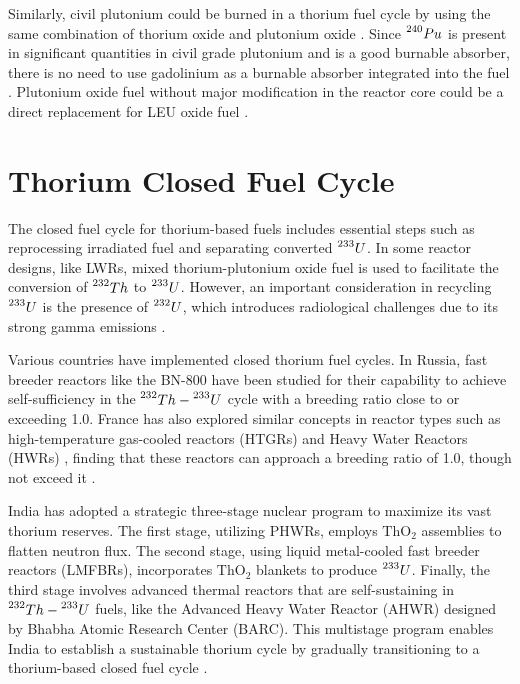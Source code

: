Similarly, civil plutonium could be burned in a thorium fuel cycle by using the same combination of thorium oxide and plutonium oxide \cite{IAEA_Th_Potential}. Since \(\prescript{240}{}{Pu}\) is present in significant quantities in civil grade plutonium and is a good burnable absorber, there is no need to use gadolinium as a burnable absorber integrated into the fuel \cite{IAEA_Th_Potential}. Plutonium oxide fuel without major modification in the reactor core could be a direct replacement for LEU oxide fuel \cite{IAEA_Th_Potential}.


\section{Thorium Closed Fuel Cycle}

The closed fuel cycle for thorium-based fuels includes essential steps such as reprocessing irradiated fuel and separating converted \(\prescript{233}{}{U}\). In some reactor designs, like LWRs, mixed thorium-plutonium oxide fuel is used to facilitate the conversion of \(\prescript{232}{}{Th}\) to \(\prescript{233}{}{U}\). However, an important consideration in recycling \(\prescript{233}{}{U}\) is the presence of \(\prescript{232}{}{U}\), which introduces radiological challenges due to its strong gamma emissions \cite{IAEA_Th_Potential}.

Various countries have implemented closed thorium fuel cycles. In Russia, fast breeder reactors like the BN-800 have been studied for their capability to achieve self-sufficiency in the \(\prescript{232}{}{Th}-\prescript{233}{}{U}\) cycle with a breeding ratio close to or exceeding 1.0. France has also explored similar concepts in reactor types such as high-temperature gas-cooled reactors (HTGRs) and Heavy Water Reactors (HWRs) , finding that these reactors can approach a breeding ratio of 1.0, though not exceed it \cite{IAEA_Th_Potential}.

India has adopted a strategic three-stage nuclear program to maximize its vast thorium reserves. The first stage, utilizing PHWRs, employs \(\text{ThO}_2\) assemblies to flatten neutron flux. The second stage, using liquid metal-cooled fast breeder reactors (LMFBRs), incorporates \(\text{ThO}_2\) blankets to produce \(\prescript{233}{}{U}\). Finally, the third stage involves advanced thermal reactors that are self-sustaining in \(\prescript{232}{}{Th}-\prescript{233}{}{U}\) fuels, like the Advanced Heavy Water Reactor (AHWR) designed by Bhabha Atomic Research Center (BARC). This multistage program enables India to establish a sustainable thorium cycle by gradually transitioning to a thorium-based closed fuel cycle \cite{IAEA_Th_Potential}.

